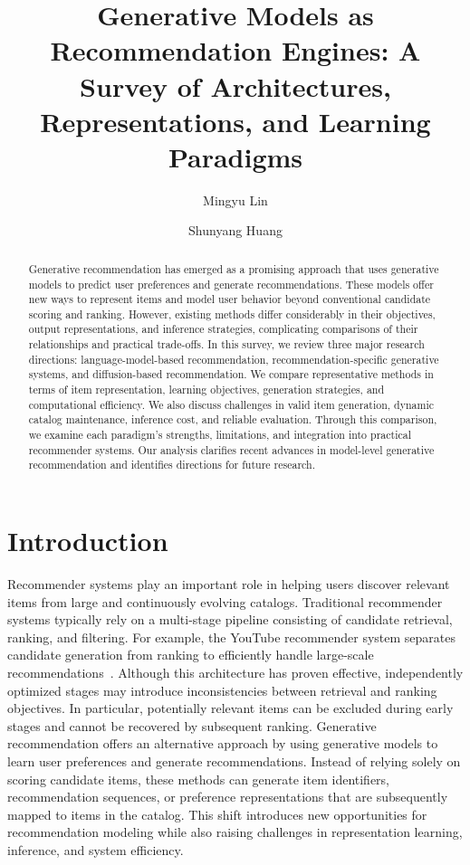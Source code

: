\documentclass[sigconf,nonacm]{acmart}
\title{Generative Models as Recommendation Engines: A Survey of Architectures, Representations, and Learning Paradigms}
\author{Mingyu Lin}
\affiliation{%
  \institution{Shanghai Jiao Tong University}
  \city{Shanghai}
  \country{China}
}
\author{Shunyang Huang}
\affiliation{%
  \institution{Shanghai Jiao Tong University}
  \city{Shanghai}
  \country{China}
}
\begin{document}
\begin{abstract}
Generative recommendation has emerged as a promising approach that uses generative models to predict user preferences and generate recommendations. These models offer new ways to represent items and model user behavior beyond conventional candidate scoring and ranking. However, existing methods differ considerably in their objectives, output representations, and inference strategies, complicating comparisons of their relationships and practical trade-offs. In this survey, we review three major research directions: language-model-based recommendation, recommendation-specific generative systems, and diffusion-based recommendation. We compare representative methods in terms of item representation, learning objectives, generation strategies, and computational efficiency. We also discuss challenges in valid item generation, dynamic catalog maintenance, inference cost, and reliable evaluation. Through this comparison, we examine each paradigm's strengths, limitations, and integration into practical recommender systems. Our analysis clarifies recent advances in model-level generative recommendation and identifies directions for future research.
\end{abstract}
\maketitle

\section{Introduction}

Recommender systems play an important role in helping users discover relevant items from large and continuously evolving catalogs. Traditional recommender systems typically rely on a multi-stage pipeline consisting of candidate retrieval, ranking, and filtering. For example, the YouTube recommender system separates candidate generation from ranking to efficiently handle large-scale recommendations~\cite{youtube}. Although this architecture has proven effective, independently optimized stages may introduce inconsistencies between retrieval and ranking objectives. In particular, potentially relevant items can be excluded during early stages and cannot be recovered by subsequent ranking. Generative recommendation offers an alternative approach by using generative models to learn user preferences and generate recommendations. Instead of relying solely on scoring candidate items, these methods can generate item identifiers, recommendation sequences, or preference representations that are subsequently mapped to items in the catalog. This shift introduces new opportunities for recommendation modeling while also raising challenges in representation learning, inference, and system efficiency.
\end{document}
